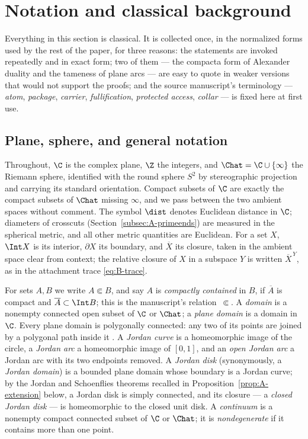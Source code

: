 
\section{Notation and classical background}\label{sec:prelim}

Everything in this section is classical.  It is collected once, in the
normalized forms used by the rest of the paper, for three reasons: the
statements are invoked repeatedly and in exact form; two of them --- the
compacta form of Alexander duality and the tameness of plane arcs --- are
easy to quote in weaker versions that would not support the proofs; and the
source manuscript's terminology --- \emph{atom}, \emph{package},
\emph{carrier}, \emph{fullification}, \emph{protected access},
\emph{collar} --- is fixed here at first use.

\subsection{Plane, sphere, and general notation}\label{subsec:A-notation}

Throughout, $\C$ is the complex plane, $\Z$ the integers, and
$\Chat=\C\cup\{\infty\}$ the Riemann sphere, identified with the round
sphere $S^2$ by stereographic projection and carrying its standard
orientation.  Compact subsets of $\C$ are exactly the compact subsets of
$\Chat$ missing $\infty$, and we pass between the two ambient spaces
without comment.  The symbol $\dist$ denotes Euclidean distance in $\C$;
diameters of crosscuts (Section~\ref{subsec:A-primeends}) are measured in
the spherical metric, and all other metric quantities are Euclidean.  For
a set $X$, $\Int X$ is its interior, $\partial X$ its boundary, and
$\overline{X}$ its closure, taken in the ambient space clear from context;
the relative closure of $X$ in a subspace $Y$ is written
$\overline{X}^{\,Y}$, as in the attachment trace \eqref{eq:B-trace}.

For sets $A,B$ we write $A\Subset B$, and say $A$ is \emph{compactly
contained} in $B$, if $\overline{A}$ is compact and
$\overline{A}\subset\Int B$; this is the manuscript's relation~$\Subset$.
A \emph{domain} is a nonempty connected open subset of $\C$ or $\Chat$; a
\emph{plane domain} is a domain in $\C$.  Every plane domain is polygonally
connected: any two of its points are joined by a polygonal path inside it
\cite{New51}.  A \emph{Jordan curve} is a homeomorphic image of the circle,
a \emph{Jordan arc} a homeomorphic image of $[0,1]$, and an \emph{open
Jordan arc} a Jordan arc with its two endpoints removed.  A \emph{Jordan
disk} (synonymously, a \emph{Jordan domain}) is a bounded plane domain
whose boundary is a Jordan curve; by the Jordan and Schoenflies theorems
recalled in Proposition~\ref{prop:A-extension} below, a Jordan disk is
simply connected, and its closure --- a \emph{closed Jordan disk} --- is
homeomorphic to the closed unit disk.  A \emph{continuum} is a nonempty
compact connected subset of $\C$ or $\Chat$; it is \emph{nondegenerate} if
it contains more than one point.

